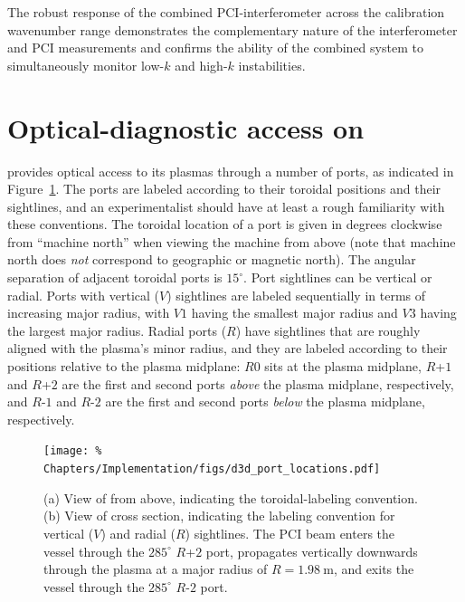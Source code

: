 The robust response of the combined PCI-interferometer
across the calibration wavenumber range
demonstrates the complementary nature
of the interferometer and PCI measurements and
confirms the ability of the combined system
to simultaneously monitor low-$k$ and high-$k$ instabilities.


\section{Optical-diagnostic access on \diiid}
\label{sec:Implementation:d3d_ports}
\diiid \space provides optical access to its plasmas
through a number of ports, as indicated in
Figure~\ref{fig:Implementation:d3d_port_locations}.
The ports are labeled according to their
toroidal positions and their sightlines, and
an experimentalist should have at least
a rough familiarity with these conventions.
The toroidal location of a port
is given in degrees clockwise from ``machine north''
when viewing the machine from above
(note that machine north does \emph{not} correspond
to geographic or magnetic north).
The angular separation of adjacent toroidal ports is $15^{\circ}$.
Port sightlines can be vertical or radial.
Ports with vertical ($V$) sightlines
are labeled sequentially in terms of increasing major radius,
with $V1$ having the smallest major radius and
$V3$ having the largest major radius.
Radial ports ($R$) have sightlines
that are roughly aligned with the plasma's minor radius, and
they are labeled according to their positions
relative to the plasma midplane:
$R0$ sits at the plasma midplane,
{$R$+$1$} and {$R$+$2$} are the first and second ports
\emph{above} the plasma midplane, respectively, and
{$R$-$1$} and {$R$-$2$} are the first and second ports
\emph{below} the plasma midplane, respectively.

\begin{figure}
  \centering
  \texttt{[image: \%
    Chapters/Implementation/figs/d3d\_port\_locations.pdf]}
  \caption[\diiid \space port-labeling conventions and location of PCI]{%
    (a) View of \diiid \space from above,
    indicating the toroidal-labeling convention.
    (b) View of \diiid \space cross section,
    indicating the labeling convention
    for vertical ($V$) and radial ($R$) sightlines.
    The PCI beam enters the vessel through the $285^{\circ}$ {$R$+$2$} port,
    propagates vertically downwards through the plasma
    at a major radius of $R = \SI{1.98}{\meter}$, and
    exits the vessel through the $285^{\circ}$ {$R$-$2$} port.}
\label{fig:Implementation:d3d_port_locations}
\end{figure}


